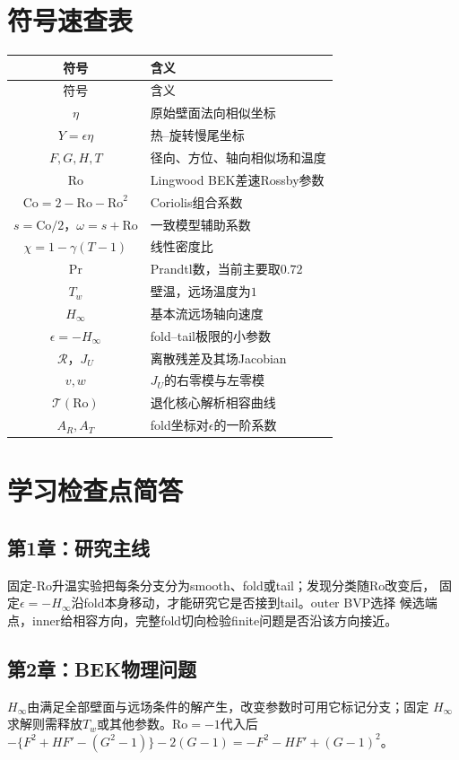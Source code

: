 \documentclass[UTF8,zihao=-4,openany]{ctexbook}
\newcommand{\eps}{\epsilon}
\newcommand{\Ro}{\mathrm{Ro}}
\newcommand{\Pran}{\mathrm{Pr}}
\newcommand{\Co}{\mathrm{Co}}
\newcommand{\R}{\mathcal R}
\newcommand{\Tcurve}{\mathcal T}
\begin{document}
\appendix

\chapter{符号速查表}\label{app:symbols}

\begin{longtable}{cl}
\toprule
符号 & 含义\\
\midrule
\endfirsthead
\toprule
符号 & 含义\\
\midrule
\endhead
$\eta$ & 原始壁面法向相似坐标\\
$Y=\eps\eta$ & 热--旋转慢尾坐标\\
$F,G,H,T$ & 径向、方位、轴向相似场和温度\\
$\Ro$ & Lingwood BEK差速Rossby参数\\
$\Co=2-\Ro-\Ro^2$ & Coriolis组合系数\\
$s=\Co/2$，$\omega=s+\Ro$ & 一致模型辅助系数\\
$\chi=1-\gamma(T-1)$ & 线性密度比\\
$\Pran$ & Prandtl数，当前主要取$0.72$\\
$T_w$ & 壁温，远场温度为$1$\\
$H_\infty$ & 基本流远场轴向速度\\
$\eps=-H_\infty$ & fold--tail极限的小参数\\
$\R$，$J_U$ & 离散残差及其场Jacobian\\
$v,w$ & $J_U$的右零模与左零模\\
$\Tcurve(\Ro)$ & 退化核心解析相容曲线\\
$A_R,A_T$ & fold坐标对$\eps$的一阶系数\\
\bottomrule
\end{longtable}

\chapter{学习检查点简答}\label{app:answers}

\section*{第1章：研究主线}
固定-$\Ro$升温实验把每条分支分为smooth、fold或tail；发现分类随$\Ro$改变后，
固定$\eps=-H_\infty$沿fold本身移动，才能研究它是否接到tail。outer BVP选择
候选端点，inner给相容方向，完整fold切向检验finite问题是否沿该方向接近。

\section*{第2章：BEK物理问题}
$H_\infty$由满足全部壁面与远场条件的解产生，改变参数时可用它标记分支；固定
$H_\infty$求解则需释放$T_w$或其他参数。$\Ro=-1$代入后
$-\{F^2+HF'-(G^2-1)\}-2(G-1)= -F^2-HF'+(G-1)^2$。
\end{document}
